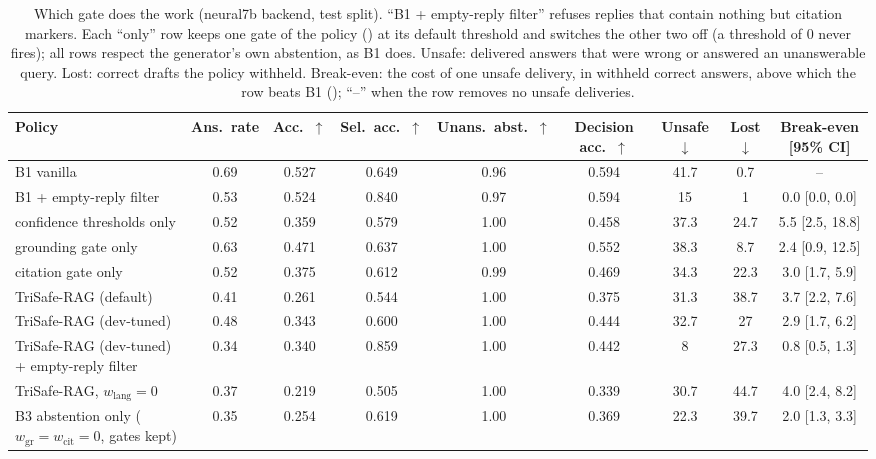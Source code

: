 \begin{table}[t]
  \caption{Which gate does the work (neural7b backend, test split). ``B1 + empty-reply filter'' refuses replies that contain nothing but citation markers. Each ``only'' row keeps one gate of the policy (\PolicyRef) at its default threshold and switches the other two off (a threshold of 0 never fires); all rows respect the generator's own abstention, as B1 does. Unsafe: delivered answers that were wrong or answered an unanswerable query. Lost: correct drafts the policy withheld. Break-even: the cost of one unsafe delivery, in withheld correct answers, above which the row beats B1 (\CostRef); ``--'' when the row removes no unsafe deliveries.}
  \label{tab:gates-neural7b}
  \footnotesize
  \setlength{\tabcolsep}{4pt}
  \begin{tabular}{lcccccccc}
    \toprule
    Policy & Ans.\ rate & Acc.\ $\uparrow$ & Sel.\ acc.\ $\uparrow$ & Unans.\ abst.\ $\uparrow$ & Decision acc.\ $\uparrow$ & Unsafe $\downarrow$ & Lost $\downarrow$ & Break-even [95\% CI] \\
    \midrule
    B1 vanilla & 0.69 & 0.527 & 0.649 & 0.96 & 0.594 & 41.7 & 0.7 & -- \\
    B1 + empty-reply filter & 0.53 & 0.524 & 0.840 & 0.97 & 0.594 & 15 & 1 & 0.0 [0.0, 0.0] \\
    confidence thresholds only & 0.52 & 0.359 & 0.579 & 1.00 & 0.458 & 37.3 & 24.7 & 5.5 [2.5, 18.8] \\
    grounding gate only & 0.63 & 0.471 & 0.637 & 1.00 & 0.552 & 38.3 & 8.7 & 2.4 [0.9, 12.5] \\
    citation gate only & 0.52 & 0.375 & 0.612 & 0.99 & 0.469 & 34.3 & 22.3 & 3.0 [1.7, 5.9] \\
    TriSafe-RAG (default) & 0.41 & 0.261 & 0.544 & 1.00 & 0.375 & 31.3 & 38.7 & 3.7 [2.2, 7.6] \\
    TriSafe-RAG (dev-tuned) & 0.48 & 0.343 & 0.600 & 1.00 & 0.444 & 32.7 & 27 & 2.9 [1.7, 6.2] \\
    TriSafe-RAG (dev-tuned) + empty-reply filter & 0.34 & 0.340 & 0.859 & 1.00 & 0.442 & 8 & 27.3 & 0.8 [0.5, 1.3] \\
    TriSafe-RAG, $w_{\mathrm{lang}}=0$ & 0.37 & 0.219 & 0.505 & 1.00 & 0.339 & 30.7 & 44.7 & 4.0 [2.4, 8.2] \\
    B3 abstention only ($w_{\mathrm{gr}}{=}w_{\mathrm{cit}}{=}0$, gates kept) & 0.35 & 0.254 & 0.619 & 1.00 & 0.369 & 22.3 & 39.7 & 2.0 [1.3, 3.3] \\
    \bottomrule
  \end{tabular}
\end{table}
